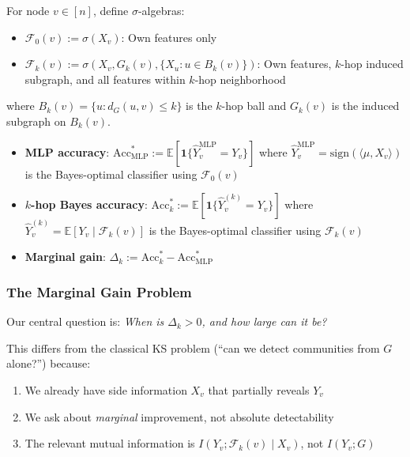 \begin{definition}
\label{def:info_sets}
For node $v \in [n]$, define $\sigma$-algebras:
\begin{itemize}
    \item $\mathcal{F}_0(v) := \sigma(X_v)$: Own features only
    \item $\mathcal{F}_k(v) := \sigma(X_v, G_k(v), \{X_u : u \in B_k(v)\})$: Own features, $k$-hop induced subgraph, and all features within $k$-hop neighborhood
\end{itemize}
where $B_k(v) = \{u : d_G(u, v) \leq k\}$ is the $k$-hop ball and $G_k(v)$ is the induced subgraph on $B_k(v)$.
\end{definition}

\begin{definition}
\label{def:accuracies_precise}
\begin{itemize}
    \item \textbf{MLP accuracy}: $\mathrm{Acc}_{\mathrm{MLP}}^* := \mathbb{E}[\mathbf{1}\{\hat{Y}_v^{\mathrm{MLP}} = Y_v\}]$ where $\hat{Y}_v^{\mathrm{MLP}} = \mathrm{sign}(\langle \mu, X_v \rangle)$ is the Bayes-optimal classifier using $\mathcal{F}_0(v)$
    \item \textbf{$k$-hop Bayes accuracy}: $\mathrm{Acc}_{k}^* := \mathbb{E}[\mathbf{1}\{\hat{Y}_v^{(k)} = Y_v\}]$ where $\hat{Y}_v^{(k)} = \mathbb{E}[Y_v \mid \mathcal{F}_k(v)]$ is the Bayes-optimal classifier using $\mathcal{F}_k(v)$
    \item \textbf{Marginal gain}: $\Delta_k := \mathrm{Acc}_{k}^* - \mathrm{Acc}_{\mathrm{MLP}}^*$
\end{itemize}
\end{definition}

\subsubsection{The Marginal Gain Problem}

Our central question is: \textit{When is $\Delta_k > 0$, and how large can it be?}

This differs from the classical KS problem (``can we detect communities from $G$ alone?'') because:
\begin{enumerate}
    \item We already have side information $X_v$ that partially reveals $Y_v$
    \item We ask about \textit{marginal} improvement, not absolute detectability
    \item The relevant mutual information is $I(Y_v; \mathcal{F}_k(v) \mid X_v)$, not $I(Y_v; G)$
\end{enumerate}

